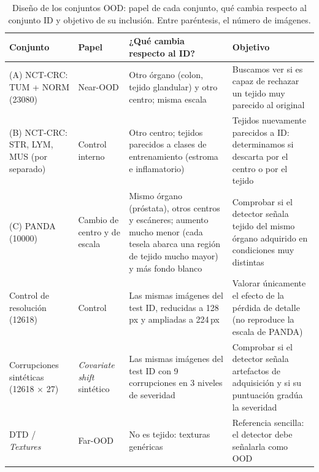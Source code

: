 \begin{table}[tbp][H]
  \centering
  \footnotesize
  \caption{Diseño de los conjuntos OOD: papel de cada conjunto, qué cambia respecto al conjunto ID y objetivo de su inclusión. Entre paréntesis, el número de imágenes.}
  \label{tab:diseno-ood}
  \begin{tabularx}{\textwidth}{@{}>{\raggedright\arraybackslash}p{}>{\raggedright\arraybackslash}p{}>{\raggedright\arraybackslash}X>{\raggedright\arraybackslash}X@{}}
    \toprule
    \textbf{Conjunto} & \textbf{Papel} & \textbf{¿Qué cambia respecto al ID?} & \textbf{Objetivo} \\
  \midrule
    (A) NCT-CRC: TUM + NORM (\num{23080}) & Near-OOD & Otro órgano (colon, tejido glandular) y otro centro; misma escala & Buscamos ver si es capaz de rechazar un tejido muy parecido al original \\
    (B) NCT-CRC: STR, LYM, MUS (por separado) & Control interno & Otro centro; tejidos parecidos a clases de entrenamiento (estroma e inflamatorio) & Tejidos nuevamente parecidos a ID: determinamos si descarta por el centro o por el tejido \\
    (C) PANDA (\num{10000})~\cite{bulten2022,kagglepanda128} & Cambio de centro y de escala & Mismo órgano (próstata), otros centros y escáneres; aumento mucho menor (cada tesela abarca una región de tejido mucho mayor) y más fondo blanco & Comprobar si el detector señala tejido del mismo órgano adquirido en condiciones muy distintas \\
    Control de resolución (\num{12618}) & Control & Las mismas imágenes del test ID, reducidas a 128\,px y ampliadas a 224\,px & Valorar únicamente el efecto de la pérdida de detalle (no reproduce la escala de PANDA) \\
    Corrupciones sintéticas (\num{12618} $\times$ 27) & \emph{Covariate shift} sintético & Las mismas imágenes del test ID con 9 corrupciones en 3 niveles de severidad & Comprobar si el detector señala artefactos de adquisición y si su puntuación gradúa la severidad \\
    DTD / \emph{Textures} & Far-OOD & No es tejido: texturas genéricas & Referencia sencilla: el detector debe señalarla como OOD \\
    \bottomrule
  \end{tabularx}
\end{table}


